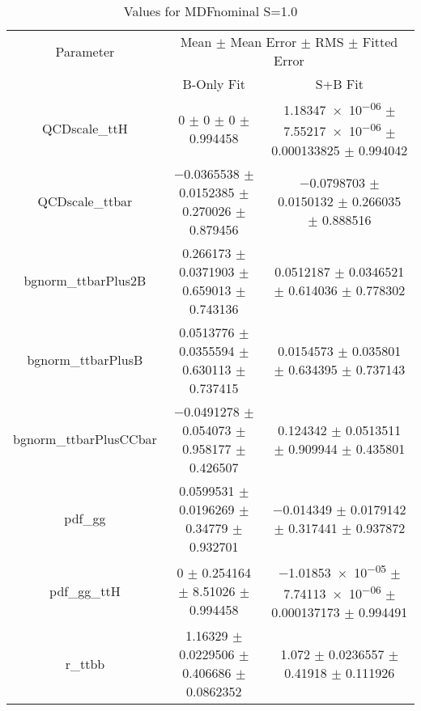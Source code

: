 \begin{table}
\centering
\caption{Values for MDFnominal S=1.0}
\begin{tabular}{ccc}
\toprule
Parameter & \multicolumn{2}{c}{Mean $\pm$ Mean Error $\pm$ RMS $\pm$ Fitted Error}\\
 & B-Only Fit & S+B Fit\\
\midrule
QCDscale\_ttH & \num{0} $\pm$ \num{0} $\pm$ \num{0} $\pm$ \num{0.994458} & \num{1.18347e-06} $\pm$ \num{7.55217e-06} $\pm$ \num{0.000133825} $\pm$ \num{0.994042}\\
QCDscale\_ttbar & \num{-0.0365538} $\pm$ \num{0.0152385} $\pm$ \num{0.270026} $\pm$ \num{0.879456} & \num{-0.0798703} $\pm$ \num{0.0150132} $\pm$ \num{0.266035} $\pm$ \num{0.888516}\\
bgnorm\_ttbarPlus2B & \num{0.266173} $\pm$ \num{0.0371903} $\pm$ \num{0.659013} $\pm$ \num{0.743136} & \num{0.0512187} $\pm$ \num{0.0346521} $\pm$ \num{0.614036} $\pm$ \num{0.778302}\\
bgnorm\_ttbarPlusB & \num{0.0513776} $\pm$ \num{0.0355594} $\pm$ \num{0.630113} $\pm$ \num{0.737415} & \num{0.0154573} $\pm$ \num{0.035801} $\pm$ \num{0.634395} $\pm$ \num{0.737143}\\
bgnorm\_ttbarPlusCCbar & \num{-0.0491278} $\pm$ \num{0.054073} $\pm$ \num{0.958177} $\pm$ \num{0.426507} & \num{0.124342} $\pm$ \num{0.0513511} $\pm$ \num{0.909944} $\pm$ \num{0.435801}\\
pdf\_gg & \num{0.0599531} $\pm$ \num{0.0196269} $\pm$ \num{0.34779} $\pm$ \num{0.932701} & \num{-0.014349} $\pm$ \num{0.0179142} $\pm$ \num{0.317441} $\pm$ \num{0.937872}\\
pdf\_gg\_ttH & \num{0} $\pm$ \num{0.254164} $\pm$ \num{8.51026} $\pm$ \num{0.994458} & \num{-1.01853e-05} $\pm$ \num{7.74113e-06} $\pm$ \num{0.000137173} $\pm$ \num{0.994491}\\
r\_ttbb & \num{1.16329} $\pm$ \num{0.0229506} $\pm$ \num{0.406686} $\pm$ \num{0.0862352} & \num{1.072} $\pm$ \num{0.0236557} $\pm$ \num{0.41918} $\pm$ \num{0.111926}\\
\bottomrule
\end{tabular}
\end{table}